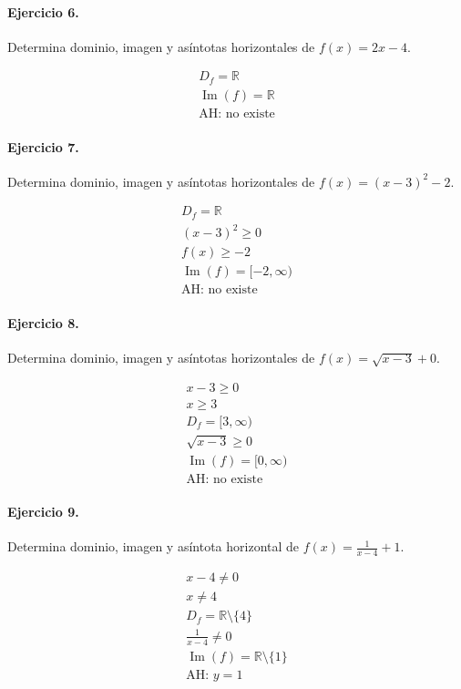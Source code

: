 \documentclass[11pt,a4paper]{article}
\begin{document}
\paragraph{Ejercicio 6.} Determina dominio, imagen y asíntotas horizontales de $f(x)=2x-4$.

\[
\begin{aligned}
D_f=\mathbb{R}\\
\operatorname{Im}(f)=\mathbb{R}\\
\text{{AH: no existe}}
\end{aligned}
\]


\paragraph{Ejercicio 7.} Determina dominio, imagen y asíntotas horizontales de $f(x)=(x-3)^2-2$.

\[
\begin{aligned}
D_f=\mathbb{R}\\
(x-3)^2\ge 0\\
f(x)\ge -2\\
\operatorname{Im}(f)=[-2,\infty)\\
\text{{AH: no existe}}
\end{aligned}
\]


\paragraph{Ejercicio 8.} Determina dominio, imagen y asíntotas horizontales de $f(x)=\sqrt{x-3}+0$.

\[
\begin{aligned}
x-3\ge0\\
x\ge 3\\
D_f=[3,\infty)\\
\sqrt{x-3}\ge0\\
\operatorname{Im}(f)=[0,\infty)\\
\text{{AH: no existe}}
\end{aligned}
\]


\paragraph{Ejercicio 9.} Determina dominio, imagen y asíntota horizontal de $f(x)=\frac{1}{x-4}+1$.

\[
\begin{aligned}
x-4\ne0\\
x\ne 4\\
D_f=\mathbb{R}\setminus\{4\}\\
\frac{1}{x-4}\ne0\\
\operatorname{Im}(f)=\mathbb{R}\setminus\{1\}\\
\text{AH: }y=1
\end{aligned}
\]
\end{document}
